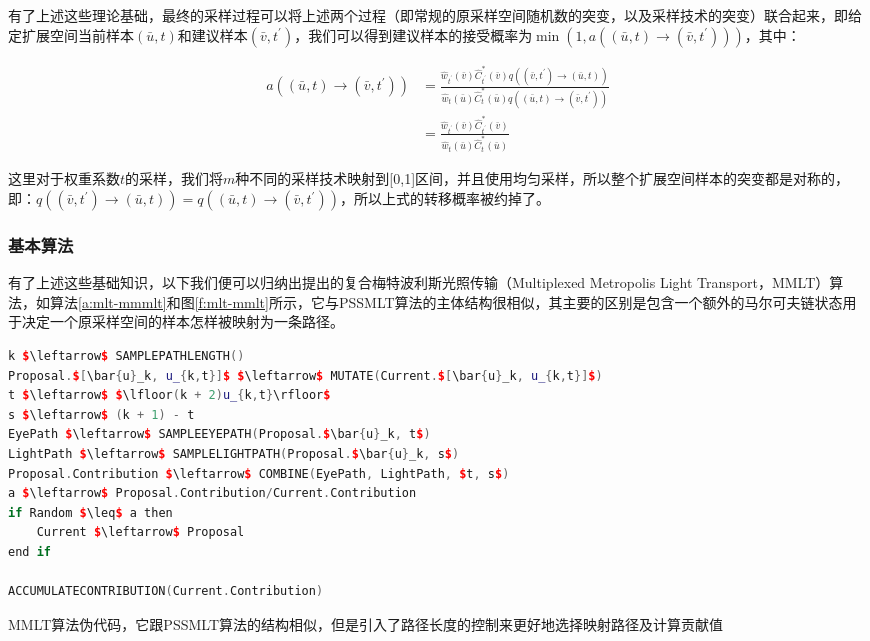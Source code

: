 有了上述这些理论基础，最终的采样过程可以将上述两个过程（即常规的原采样空间随机数的突变，以及采样技术的突变）联合起来，即给定扩展空间当前样本$(\bar{u},t)$和建议样本$(\bar{v},t^{'})$，我们可以得到建议样本的接受概率为$\min(1,a((\bar{u},t)\to(\bar{v},t^{'})))$，其中：

\begin{equation}\label{e:mlt-mmlt-acceptance}
\begin{aligned}
	a((\bar{u},t)\to(\bar{v},t^{'}))&=\frac{\hat{w}_{t^{'}}(\bar{v})\hat{C}^{*}_{t^{'}}(\bar{v})q((\bar{v},t^{'})\to(\bar{u},t))}{\hat{w}_t(\bar{u})\hat{C}^{*}_t(\bar{u})q((\bar{u},t)\to(\bar{v},t^{'}))}\\
	&=\frac{\hat{w}_{t^{'}}(\bar{v})\hat{C}^{*}_{t^{'}}(\bar{v})}{\hat{w}_t(\bar{u})\hat{C}^{*}_t(\bar{u})}
\end{aligned}
\end{equation}

\noindent 这里对于权重系数$t$的采样，我们将$m$种不同的采样技术映射到[0,1]区间，并且使用均匀采样，所以整个扩展空间样本的突变都是对称的，即：$q((\bar{v},t^{'})\to(\bar{u},t))=q((\bar{u},t)\to(\bar{v},t^{'}))$，所以上式的转移概率被约掉了。




\subsubsection{基本算法}
有了上述这些基础知识，以下我们便可以归纳出\cite{a:MultiplexedMetropolisLightTransport}提出的复合梅特波利斯光照传输（Multiplexed Metropolis Light Transport，MMLT）算法，如算法\ref{a:mlt-mmmlt}和图\ref{f:mlt-mmlt}所示，它与PSSMLT算法的主体结构很相似，其主要的区别是包含一个额外的马尔可夫链状态用于决定一个原采样空间的样本怎样被映射为一条路径。

\begin{algorithm}
\begin{lstlisting}[language=C++, mathescape]
k $\leftarrow$ SAMPLEPATHLENGTH()
Proposal.$[\bar{u}_k, u_{k,t}]$ $\leftarrow$ MUTATE(Current.$[\bar{u}_k, u_{k,t}]$)
t $\leftarrow$ $\lfloor(k + 2)u_{k,t}\rfloor$
s $\leftarrow$ (k + 1) - t
EyePath $\leftarrow$ SAMPLEEYEPATH(Proposal.$\bar{u}_k, t$)
LightPath $\leftarrow$ SAMPLELIGHTPATH(Proposal.$\bar{u}_k, s$) 
Proposal.Contribution $\leftarrow$ COMBINE(EyePath, LightPath, $t, s$) 
a $\leftarrow$ Proposal.Contribution/Current.Contribution
if Random $\leq$ a then
	Current $\leftarrow$ Proposal
end if

ACCUMULATECONTRIBUTION(Current.Contribution)\end{lstlisting}
\caption{MMLT算法伪代码，它跟PSSMLT算法的结构相似，但是引入了路径长度的控制来更好地选择映射路径及计算贡献值}
\label{a:mlt-mmmlt}
\end{algorithm}

